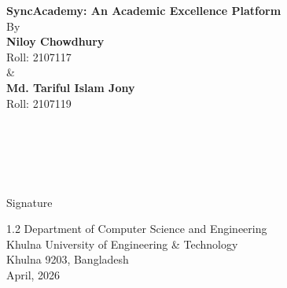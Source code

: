 \documentclass[12pt,a4paper]{report}
\begin{document}
\setcounter{page}{1}
\thispagestyle{plain}

\begin{center}
{\fontsize{18}{27}\selectfont\bfseries
SyncAcademy: An Academic Excellence Platform}\\
\vspace{3\baselineskip}
{\fontsize{12}{18}\selectfont By}\\
\vspace{2\baselineskip}
{\fontsize{12}{18}\selectfont\bfseries Niloy Chowdhury}\\
{\fontsize{12}{18}\selectfont Roll: 2107117}\\[6pt]
{\fontsize{12}{18}\selectfont \&}\\[6pt]
{\fontsize{12}{18}\selectfont\bfseries Md. Tariful Islam Jony}\\
{\fontsize{12}{18}\selectfont Roll: 2107119}\\
\vspace{4\baselineskip}
\end{center}

\\[6pt]
\\
\\
\hfill
\begin{minipage}[t]{1.8in}
\centering
\underline{\hspace{1.8in}}\\[2pt]
{\fontsize{12}{18}\selectfont Signature}
\end{minipage}

\vfill


\begin{center}
\begin{spacing}{1.2}
{\fontsize{12}{14}\selectfont
Department of Computer Science and Engineering\\
Khulna University of Engineering \& Technology\\
Khulna 9203, Bangladesh\\
April, 2026}
\end{spacing}
\end{center}
\newpage
\end{document}
